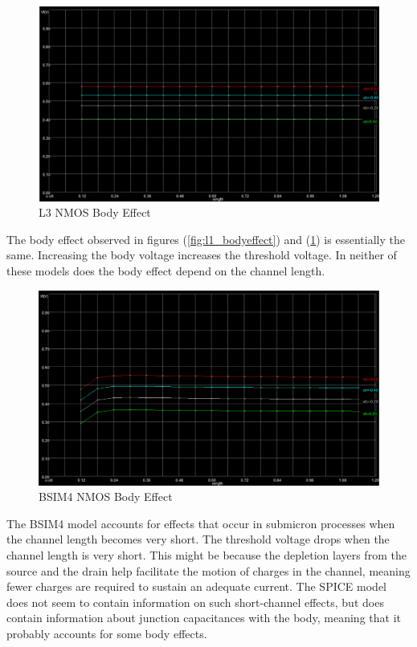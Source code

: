 \begin{figure}[h!]
	\centering
	\includegraphics[scale=0.75]{../images/l3_bodyeffect.PNG}
	\caption{L3 NMOS Body Effect}
	\label{fig:l3_bodyeffect}
\end{figure}

\FloatBarrier

The body effect observed in figures (\ref{fig:l1_bodyeffect}) and (\ref{fig:l3_bodyeffect}) is essentially the same.
Increasing the body voltage increases the threshold voltage.
In neither of these models does the body effect depend on the channel length.

\FloatBarrier

\begin{figure}[h!]
	\centering
	\includegraphics[scale=0.75]{../images/bsim4_bodyeffect.PNG}
	\caption{BSIM4 NMOS Body Effect}
	\label{fig:bsim4_bodyeffect}
\end{figure}

\FloatBarrier

The BSIM4 model accounts for effects that occur in submicron processes when the channel length becomes very short.
The threshold voltage drops when the channel length is very short.
This might be because the depletion layers from the source and the drain help facilitate the motion of charges in the channel, meaning fewer charges are required to sustain an adequate current.
The SPICE model does not seem to contain information on such short-channel effects, but does contain information about junction capacitances with the body, meaning that it probably accounts for some body effects. \\

